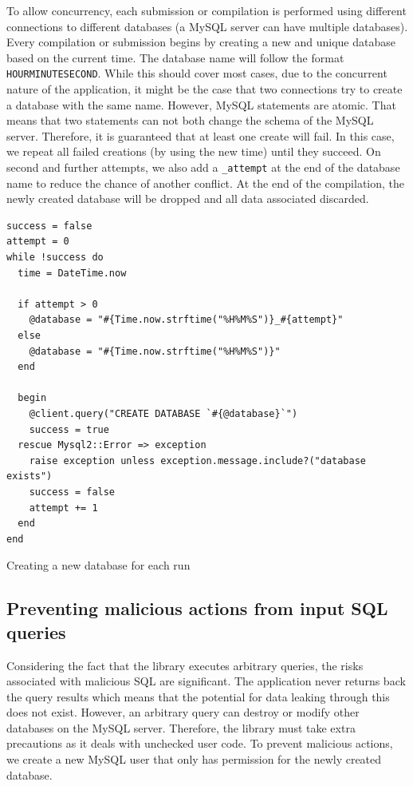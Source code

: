 To allow concurrency, each submission or compilation is performed using different connections to different databases (a MySQL server can have multiple databases).  Every compilation or submission begins by creating a new and unique database based on the current time. The database name will follow the format \texttt{HOURMINUTESECOND}. While this should cover most cases, due to the concurrent nature of the application, it might be the case that two connections try to create a database with the same name. However, MySQL statements are atomic. That means that two statements can not both change the schema of the MySQL server. Therefore, it is guaranteed that at least one create will fail. In this case, we repeat all failed creations (by using the new time) until they succeed. On second and further attempts, we also add a \texttt{_attempt} at the end of the database name to reduce the chance of another conflict. At the end of the compilation, the newly created database will be dropped and all data associated discarded.

\begin{code}
    \begin{verbatim}
success = false
attempt = 0
while !success do
  time = DateTime.now

  if attempt > 0
    @database = "#{Time.now.strftime("%H%M%S")}_#{attempt}"
  else
    @database = "#{Time.now.strftime("%H%M%S")}"
  end

  begin
    @client.query("CREATE DATABASE `#{@database}`")
    success = true
  rescue Mysql2::Error => exception
    raise exception unless exception.message.include?("database exists")
    success = false
    attempt += 1
  end
end
\end{verbatim}
    \caption{Creating a new database for each run}
    \label{fig:creating_new_database}
\end{code}

\subsection{Preventing malicious actions from input SQL queries}

Considering the fact that the library executes arbitrary queries, the risks associated with malicious SQL are significant. The application never returns back the query results which means that the potential for data leaking through this does not exist. However, an arbitrary query can destroy or modify other databases on the MySQL server. Therefore, the library must take extra precautions as it deals with unchecked user code. To prevent malicious actions, we create a new MySQL user that only has permission for the newly created database.

